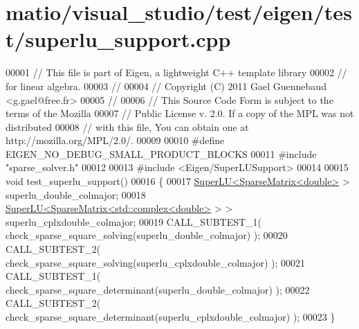 \hypertarget{matio_2visual__studio_2test_2eigen_2test_2superlu__support_8cpp_source}{}\section{matio/visual\+\_\+studio/test/eigen/test/superlu\+\_\+support.cpp}
\label{matio_2visual__studio_2test_2eigen_2test_2superlu__support_8cpp_source}

\begin{DoxyCode}
00001 \textcolor{comment}{// This file is part of Eigen, a lightweight C++ template library}
00002 \textcolor{comment}{// for linear algebra.}
00003 \textcolor{comment}{//}
00004 \textcolor{comment}{// Copyright (C) 2011 Gael Guennebaud <g.gael@free.fr>}
00005 \textcolor{comment}{//}
00006 \textcolor{comment}{// This Source Code Form is subject to the terms of the Mozilla}
00007 \textcolor{comment}{// Public License v. 2.0. If a copy of the MPL was not distributed}
00008 \textcolor{comment}{// with this file, You can obtain one at http://mozilla.org/MPL/2.0/.}
00009 
00010 \textcolor{preprocessor}{#define EIGEN\_NO\_DEBUG\_SMALL\_PRODUCT\_BLOCKS}
00011 \textcolor{preprocessor}{#include "sparse\_solver.h"}
00012 
00013 \textcolor{preprocessor}{#include <Eigen/SuperLUSupport>}
00014 
00015 \textcolor{keywordtype}{void} test\_superlu\_support()
00016 \{
00017   \hyperlink{class_eigen_1_1_super_l_u}{SuperLU<SparseMatrix<double>} > superlu\_double\_colmajor;
00018   \hyperlink{class_eigen_1_1_super_l_u}{SuperLU<SparseMatrix<std::complex<double>} > > 
      superlu\_cplxdouble\_colmajor;
00019   CALL\_SUBTEST\_1( check\_sparse\_square\_solving(superlu\_double\_colmajor)      );
00020   CALL\_SUBTEST\_2( check\_sparse\_square\_solving(superlu\_cplxdouble\_colmajor)  );
00021   CALL\_SUBTEST\_1( check\_sparse\_square\_determinant(superlu\_double\_colmajor)      );
00022   CALL\_SUBTEST\_2( check\_sparse\_square\_determinant(superlu\_cplxdouble\_colmajor)  );
00023 \}
\end{DoxyCode}
